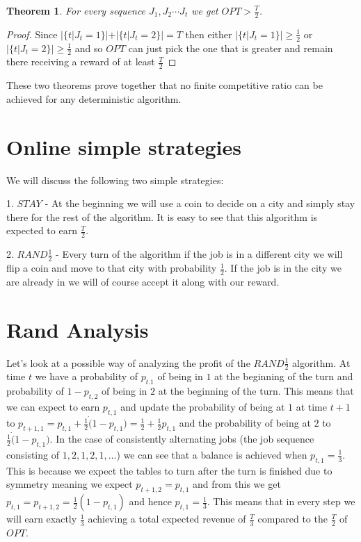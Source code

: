 \documentclass[]{article}
\newtheorem{theorem}{Theorem}
\newcommand{\rand}{ $ RAND \frac{1}{2} $ }
\begin{document}
\begin{theorem}
	
	For every sequence $ J_1,J_2 \cdots J_t $ we get $ OPT > \frac{T}{2} $.
	
\end{theorem}
\begin{proof}
	
	Since $ | \{ t | J_t = 1 \} | + | \{ t | J_t = 2 \} | = T $ then either $ | \{ t | J_t = 1 \} | \geq 
\frac{1}{2} $ or $ | \{ t | J_t = 2 \} | \geq 
\frac{1}{2} $ and so $ OPT $ can just pick the one that is greater and remain there receiving a reward of at least $ \frac{T}{2} $

\end{proof}

These two theorems prove together that no finite competitive ratio can be achieved for any deterministic algorithm.


\section{Online simple strategies}

We will discuss the following two simple strategies:

1. $ STAY $ - At the beginning we will use a coin to decide on a city and simply stay there for the rest of the algorithm. It is easy to see that this algorithm is expected to earn $ \frac{T}{2} $.

2. \rand - Every turn of the algorithm if the job is in a different city we will flip a coin and move to that city with probability $ \frac{1}{2} $. If the job is in the city we are already in we will of course accept it along with our reward.

\section{Rand Analysis}

Let's look at a possible way of analyzing the profit of the \rand algorithm. At time $ t $ we have a probability of $ p_{t.1} $ of being in $ 1 $ at the beginning of the turn and probability of $ 1 - p_{t,2} $ of being in $ 2 $ at the beginning of the turn. This means that we can expect to earn $ p_{t,1} $ and update the probability of being at $ 1 $ at time $ t + 1 $ to $ p_{t+1,1} = p_{t,1} + \frac{1}{2} \dot ( 1 - p_{t,1} ) = \frac{1}{2} + \frac{1}{2}p_{t,1}$ and the probability of being at $ 2 $ to $ \frac{1}{2} \dot ( 1 - p_{t,1} ) $. In the case of consistently alternating jobs (the job sequence consisting of $ 1, 2, 1, 2, 1, \ldots $) we can see that a balance is achieved when $ p_{t,1} = \frac{1}{3} $. This is because we expect the tables to turn after the turn is finished due to symmetry meaning we expect $ p_{t+1,2} = p_{t,1} $ and from this we get $ p_{t,1} = p_{t+1,2} = \frac{1}{2}(1 - p_{t,1}) $ and hence $ p_{t,1} = \frac{1}{3} $. This means that in every step we will earn exactly $ \frac{1}{3} $ achieving a total expected revenue of $ \frac{T}{3} $ compared to the $ \frac{T}{2} $ of $ OPT $.
\end{document}
